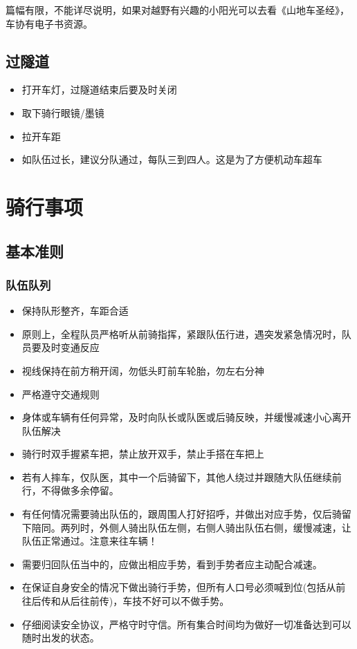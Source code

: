 \documentclass{ctexbook}
\begin{document}
篇幅有限，不能详尽说明，如果对越野有兴趣的小阳光可以去看《山地车圣经》，车协有电子书资源。
\section{过隧道}
\begin{itemize}
    \item 打开车灯，过隧道结束后要及时关闭
    \item 取下骑行眼镜/墨镜
    \item 拉开车距
    \item 如队伍过长，建议分队通过，每队三到四人。这是为了方便机动车超车
\end{itemize}
\chapter{骑行事项}
\section{基本准则}
\label{sec:基本准则}
\subsection{队伍队列}
\begin{itemize}
    \item 保持队形整齐，车距合适
    \item 原则上，全程队员严格听从前骑指挥，紧跟队伍行进，遇突发紧急情况时，队员要及时变通反应
    \item 视线保持在前方稍开阔，勿低头盯前车轮胎，勿左右分神
    \item 严格遵守交通规则
    \item 身体或车辆有任何异常，及时向队长或队医或后骑反映，并缓慢减速小心离开队伍解决
    \item 骑行时双手握紧车把，禁止放开双手，禁止手搭在车把上
    \item 若有人摔车，仅队医，其中一个后骑留下，其他人绕过并跟随大队伍继续前行，不得做多余停留。
    \item 有任何情况需要骑出队伍的，跟周围人打好招呼，并做出对应手势，仅后骑留下陪同。两列时，外侧人骑出队伍左侧，右侧人骑出队伍右侧，缓慢减速，让队伍正常通过。注意来往车辆！
    \item 需要归回队伍当中的，应做出相应手势，看到手势者应主动配合减速。
    \item 在保证自身安全的情况下做出骑行手势，但所有人口号必须喊到位(包括从前往后传和从后往前传)，车技不好可以不做手势。
    \item 仔细阅读安全协议，严格守时守信。所有集合时间均为做好一切准备达到可以随时出发的状态。
\end{itemize}
\end{document}
